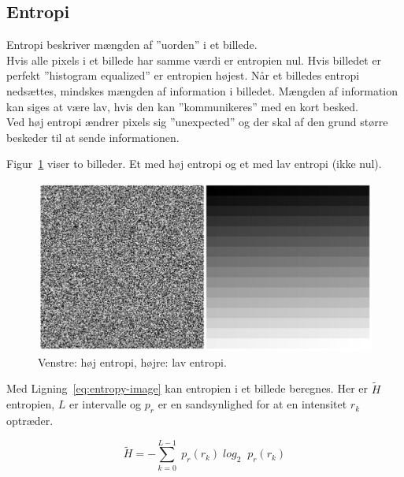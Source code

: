 \subsection{Entropi}

Entropi beskriver mængden af ''uorden'' i et billede. \\

Hvis alle pixels i et billede har samme værdi er entropien nul. Hvis billedet er perfekt ''histogram equalized'' er entropien højest. Når et billedes entropi nedsættes, mindskes mængden af information i billedet. Mængden af information kan siges at være lav, hvis den kan ''kommunikeres'' med en kort besked.\\

Ved høj entropi ændrer pixels sig ''unexpected'' og der skal af den grund større beskeder til at sende informationen.

Figur~\ref{fig:entropy} viser to billeder. Et med høj entropi og et med lav entropi (ikke nul).

\begin{figure}[H]
	\centering
	\includegraphics[width=0.7\linewidth]{figs/spm08/entropy}
	\caption{Venstre: høj entropi, højre: lav entropi.}
	\label{fig:entropy}
\end{figure}

Med Ligning~\ref{eq:entropy-image}  kan entropien i et billede beregnes. Her er $\widetilde{H}$ entropien, $L$ er intervalle og $p_r$ er en sandsynlighed for at en intensitet $r_k$ optræder.

\begin{equation}\label{eq:entropy-image}
\widetilde{H} =  - \sum_{k = 0}^{L-1} \; p_r (r_k) \; log_2 \; \; p_r (r_k)
\end{equation}